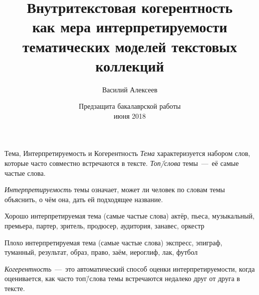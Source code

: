 \documentclass[russian]{beamer}
\title[Внутритекстовая когерентность]
{
  Внутритекстовая когерентность\\
  как мера интерпретируемости\\
  тематических моделей текстовых коллекций\\
}
\subtitle{}
\author[Василий Алексеев]{
  Василий Алексеев
}
\institute[]
{
  \footnotesize
}
\date[IS 2018]
{
  \footnotesize
  {
    Предзащита бакалаврской работы\\ \bigskip 13 июня 2018
  }
}
\begin{document}

		

  
\frame{\titlepage}


\begin{frame}{Тема, Интерпретируемость и Когерентность}
  \emph{Тема} характеризуется набором слов, которые часто совместно встречаются в тексте.
  \emph{Топ\=/слова} темы~---~её самые частые слова.
  
  \medskip
  
  \emph{Интерпретируемость} темы означает, может ли человек по словам темы объяснить, о чём она, дать ей подходящее название.
  
  \vspace{0.25cm}
  
  \begin{exampleblock}{Хорошо интерпретируемая тема (самые частые слова)}
    актёр, пьеса, музыкальный, премьера, партер, зритель, продюсер, аудитория, занавес, оркестр
  \end{exampleblock}
  
  \begin{alertblock}{Плохо интерпретируемая тема (самые частые слова)}
    экспресс, эпиграф, туманный, результат, образ, право, 
    заём, иероглиф, лак, футбол
  \end{alertblock}
  
  \smallskip
  
  \emph{Когерентность}~---~это автоматический способ оценки интерпретируемости, когда оценивается, как часто топ\=/слова темы встречаются недалеко друг от друга в тексте.
\end{frame}
\end{document}
